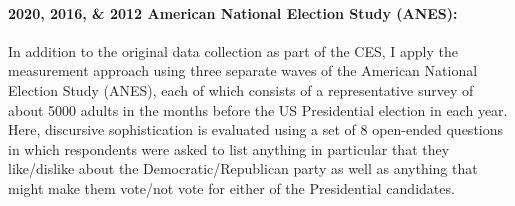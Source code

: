\paragraph{2020, 2016, \& 2012 American National Election Study (ANES):}
In addition to the original data collection as part of the CES, I apply the measurement approach using three separate waves of the American National Election Study (ANES), each of which consists of a representative survey of about 5000 adults in the months before the US Presidential election in each year. Here, discursive sophistication is evaluated using a set of 8 open-ended questions in which respondents were asked to list anything in particular that they like/dislike about the Democratic/Republican party as well as anything that might make them vote/not vote for either of the Presidential candidates.

